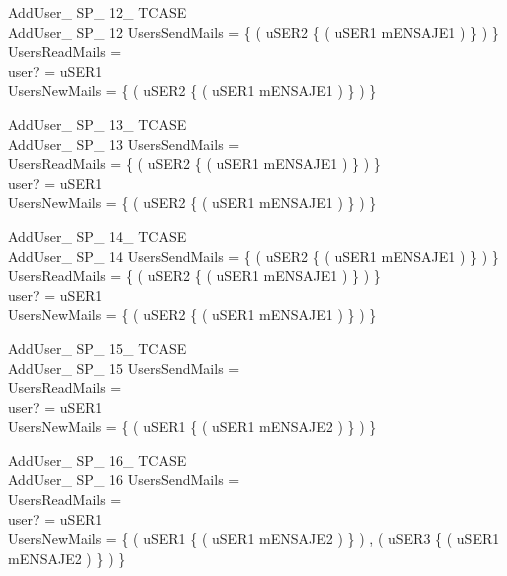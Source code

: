 \begin{schema}{AddUser\_ SP\_ 12\_ TCASE}\\
 AddUser\_ SP\_ 12
\where
 UsersSendMails = \{ ( uSER2 \mapsto \{ ( uSER1 \mapsto mENSAJE1 ) \} ) \} \\
 UsersReadMails =~\emptyset \\
 user? = uSER1 \\
 UsersNewMails = \{ ( uSER2 \mapsto \{ ( uSER1 \mapsto mENSAJE1 ) \} ) \}
\end{schema}


\begin{schema}{AddUser\_ SP\_ 13\_ TCASE}\\
 AddUser\_ SP\_ 13
\where
 UsersSendMails =~\emptyset \\
 UsersReadMails = \{ ( uSER2 \mapsto \{ ( uSER1 \mapsto mENSAJE1 ) \} ) \} \\
 user? = uSER1 \\
 UsersNewMails = \{ ( uSER2 \mapsto \{ ( uSER1 \mapsto mENSAJE1 ) \} ) \}
\end{schema}


\begin{schema}{AddUser\_ SP\_ 14\_ TCASE}\\
 AddUser\_ SP\_ 14
\where
 UsersSendMails = \{ ( uSER2 \mapsto \{ ( uSER1 \mapsto mENSAJE1 ) \} ) \} \\
 UsersReadMails = \{ ( uSER2 \mapsto \{ ( uSER1 \mapsto mENSAJE1 ) \} ) \} \\
 user? = uSER1 \\
 UsersNewMails = \{ ( uSER2 \mapsto \{ ( uSER1 \mapsto mENSAJE1 ) \} ) \}
\end{schema}


\begin{schema}{AddUser\_ SP\_ 15\_ TCASE}\\
 AddUser\_ SP\_ 15
\where
 UsersSendMails =~\emptyset \\
 UsersReadMails =~\emptyset \\
 user? = uSER1 \\
 UsersNewMails = \{ ( uSER1 \mapsto \{ ( uSER1 \mapsto mENSAJE2 ) \} ) \}
\end{schema}

{\footnotesize
\begin{schema}{AddUser\_ SP\_ 16\_ TCASE}\\
 AddUser\_ SP\_ 16
\where
 UsersSendMails =~\emptyset \\
 UsersReadMails =~\emptyset \\
 user? = uSER1 \\
 UsersNewMails = \{ ( uSER1 \mapsto \{ ( uSER1 \mapsto mENSAJE2 ) \} ) , ( uSER3 \mapsto \{ ( uSER1 \mapsto mENSAJE2 ) \} ) \}
\end{schema}
}

